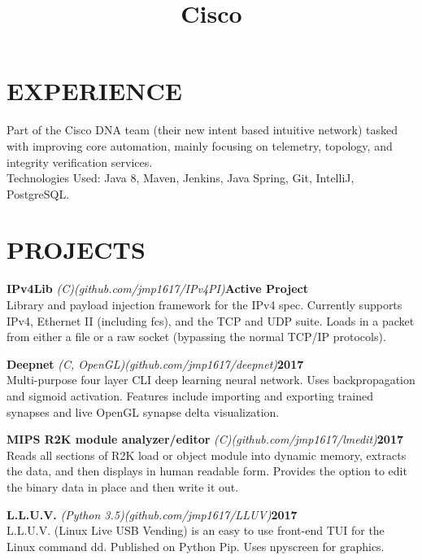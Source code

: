 \documentclass[line,margin]{res}
\begin{document}
\begin{resume}
\section{EXPERIENCE}
\title{\textbf{Cisco}}
\begin{position}
Part of the Cisco DNA team (their new intent based intuitive network) tasked with improving core automation, mainly focusing on telemetry, topology, and integrity verification services.
\\
Technologies Used: 
Java 8, Maven, Jenkins, Java Spring, Git, IntelliJ, PostgreSQL.  
\end{position}

\section{PROJECTS}
\par
    {\textbf{IPv4Lib}}
    {\sl (C)}{\sl (github.com/jmp1617/IPv4PI)}\hfill \textbf{Active Project}\\ 
    Library and payload injection framework for the IPv4 spec. Currently 
    supports IPv4, Ethernet II (including fcs), and the TCP and UDP suite. Loads 
    in a packet from either a file or a raw socket (bypassing the normal 
    TCP/IP protocols).
\par
    {\textbf{Deepnet}}
    {\sl (C, OpenGL)}{\sl (github.com/jmp1617/deepnet)}\hfill \textbf{2017}\\ 
    Multi-purpose four layer CLI deep learning neural network. Uses
    backpropagation and sigmoid activation. Features include importing and 
    exporting trained synapses and live OpenGL synapse delta visualization.
\par
    {\textbf{MIPS R2K module analyzer/editor}}
    {\sl (C)}{\sl (github.com/jmp1617/lmedit)}\hfill \textbf{2017}\\
    Reads all sections of R2K load or object module into dynamic memory, 
    extracts the data, and then displays in human readable form. Provides the 
    option to edit the binary data in place and then write it out.
\par
    {\textbf{L.L.U.V.}}
    {\sl (Python 3.5)}{\sl (github.com/jmp1617/LLUV)}\hfill \textbf{2017}\\ 
    L.L.U.V. (Linux Live USB Vending) is an easy to use front-end TUI for the 
    Linux command dd. Published on Python Pip. Uses npyscreen for graphics.


\end{resume}
\end{document}
